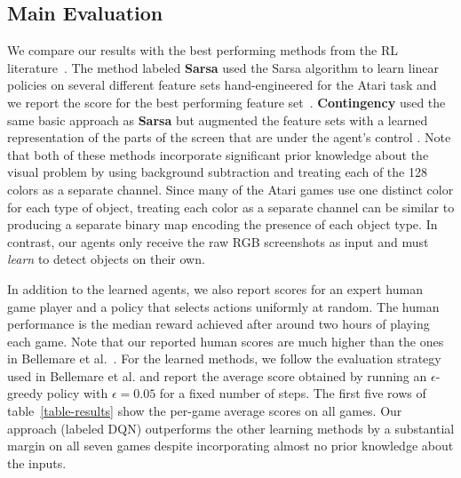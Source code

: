 \documentclass{article} %
\begin{document}
\subsection{Main Evaluation}

We compare our results with the best performing methods from the RL literature~\cite{bellemare-ale,bellemare-contingency}.  The method labeled \textbf{Sarsa} used the Sarsa algorithm to learn linear policies on several different feature sets hand-engineered for the Atari task and we report the score for the best performing feature set~\cite{bellemare-ale}.  \textbf{Contingency} used the same basic approach as \textbf{Sarsa} but augmented the feature sets with a learned representation of the parts of the screen that are under the agent's control \cite{bellemare-contingency}.  Note that both of these methods incorporate significant prior knowledge about the visual problem by using background subtraction and treating each of the 128 colors as a separate channel.  Since many of the Atari games use one distinct color for each type of object, treating each color as a separate channel can be similar to producing a separate binary map encoding the presence of each object type.  In contrast, our agents only receive the raw RGB screenshots as input and must \emph{learn} to detect objects on their own.   

In addition to the learned agents, we also report scores for an expert human game player and a policy that selects actions uniformly at random. The human performance is the median reward achieved after around two hours of playing each game. Note that our reported human scores are much higher than the ones in Bellemare et al.~\cite{bellemare-ale}.  For the learned methods, we follow the evaluation strategy used in Bellemare et al. \cite{bellemare-ale,bellemare:qtf} and report the average score obtained by running an $\epsilon$-greedy policy with $\epsilon=0.05$ for a fixed number of steps. The first five rows of table~\ref{table-results} show the per-game average scores on all games.  Our approach (labeled DQN) outperforms the other learning methods by a substantial margin on all seven games despite incorporating almost no prior knowledge about the inputs.   
\end{document}
